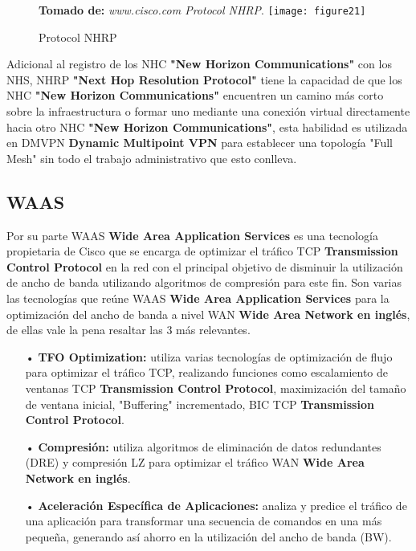 \begin{itemize}
\begin{figure}[htbp]
 \textbf{Tomado de:} \textit{www.cisco.com Protocol NHRP}.
  \centering
    {\texttt{[image: figure21]}}%
  \caption{\footnotesize{Protocol NHRP}}
  \label{fig:fig2subfig}
\end{figure}
Adicional al registro de los NHC \textbf{"New Horizon Communications"} con los NHS, NHRP \textbf{"Next Hop Resolution Protocol"} tiene la capacidad de que los NHC \textbf{"New Horizon Communications"} encuentren un camino más corto sobre la infraestructura o formar uno mediante una conexión virtual directamente hacia otro NHC \textbf{"New Horizon Communications"}, esta habilidad es utilizada en DMVPN \textbf{ Dynamic Multipoint VPN} para establecer una topología "Full Mesh" sin todo el trabajo administrativo que esto conlleva.
\end{itemize}

\subsection{WAAS}

Por su parte WAAS \textbf{Wide Area Application Services} es una tecnología propietaria de Cisco que se encarga de optimizar el tráfico TCP \textbf{Transmission Control Protocol} en la red con el principal objetivo de disminuir la utilización de ancho de banda utilizando algoritmos de compresión para este fin. Son varias las tecnologías que reúne WAAS \textbf{Wide Area Application Services} para la optimización del ancho de banda a nivel WAN \textbf{Wide Area Network en inglés}, de ellas vale la pena resaltar las 3 más relevantes.

\begin{itemize}
\item[•]\textbf{TFO Optimization:} utiliza varias tecnologías de optimización de flujo para optimizar el tráfico TCP, realizando funciones como escalamiento de ventanas TCP \textbf{Transmission Control Protocol}, maximización del tamaño de ventana inicial, "Buffering" incrementado, BIC TCP \textbf{Transmission Control Protocol}.
\item[•]\textbf{Compresión:} utiliza algoritmos de eliminación de datos redundantes (DRE) y compresión LZ para optimizar el tráfico WAN \textbf{Wide Area Network en inglés}.
\item[•]\textbf{Aceleración Específica de Aplicaciones:} analiza y predice el tráfico de una aplicación para transformar una secuencia de comandos en una más pequeña, generando así ahorro en la utilización del ancho de banda (BW).
\end{itemize}


